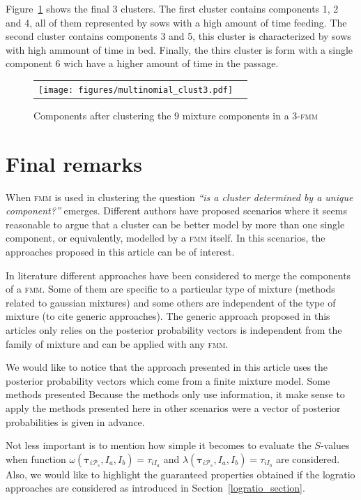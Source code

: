 \documentclass[10pt, a4paper]{article}
\newcommand{\m}[1]{\boldsymbol{#1}}
\newcommand{\fmm}{\textsc{fmm}\xspace}
\begin{document}
\begin{spacing}{1.9}
Figure~\ref{multinomial_clust3} shows the final 3 clusters. The first cluster contains components 1, 2 and 4, all of them represented by sows with a high amount of time feeding. The second cluster contains components 3 and 5, this cluster is characterized by sows with high ammount of time in bed. Finally, the thirs cluster is form with a single component 6 wich have a higher amount of time in the passage.

\begin{figure}[t]
\begin{center}
\begin{tabular}{cc}
  \texttt{[image: figures/multinomial\_clust3.pdf]} \\
 \end{tabular}
 \caption{Components after clustering the 9 mixture components in a 3-\fmm}\label{multinomial_clust3}
\end{center}
\end{figure}

\section{Final remarks}\label{remarks}

When \fmm is used in clustering the question \textit{``is a cluster determined by a unique component?''} emerges. Different authors have proposed scenarios where it seems reasonable to argue that a cluster can be better model by more than one single component, or equivalently, modelled by a \fmm itself. In this scenarios, the approaches proposed in this article can be of interest.

In literature different approaches have been considered to merge the components of a \fmm. Some of them are specific to a particular type of mixture (methods related to gaussian mixtures) and some others are independent of the type of mixture (to cite generic approaches). The generic approach proposed in this articles only relies  on the posterior probability vectors is independent from the family of mixture and can be applied with any \fmm.

We would like to notice that the approach presented in this article uses the posterior probability vectors which come from a finite mixture model. Some methods presented Because the methods only use information, it make sense to apply the methods presented here in other scenarios were a vector of posterior probabilities is given in advance.

Not less important is to mention how simple it becomes to evaluate the $S$-values when function $\omega(\m\tau_{i \mathcal{P}_s},  I_a,  I_b) = \tau_{iI_a}$ and $\lambda(\m\tau_{i \mathcal{P}_s},  I_a,  I_b) = \tau_{iI_b}$ are considered. Also, we would like to highlight the guaranteed properties obtained if the logratio approaches are considered as introduced in Section~\ref{logratio_section}.


\end{spacing}
\end{document}
